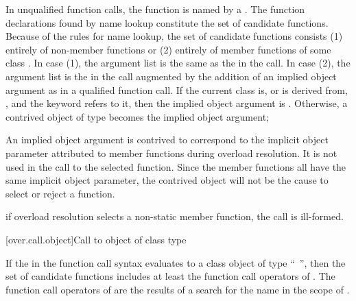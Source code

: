 \pnum
In unqualified function calls, the function is named by a
.
The function declarations found by name lookup constitute the
set of candidate functions.
Because of the rules for name lookup, the set of candidate functions
consists (1) entirely of non-member functions or (2) entirely of
member functions of some class
.
In case (1),
the argument list is
the same as the
in the call.
In case (2), the argument list is the
in the call augmented by the addition of an implied object
argument as in a qualified function call.
If the current class is, or is derived from, , and the keyword
 refers to it,
then the implied object argument is .
Otherwise,
a contrived object of type
becomes the implied object argument;
\begin{footnote}
An implied object argument is contrived to
correspond to the implicit object
parameter attributed to member functions during overload resolution.
It is not
used in
the call to the selected function.
Since the member functions all have the
same implicit
object parameter, the contrived object will not be the cause to select or
reject a
function.
\end{footnote}
if overload resolution selects a non-static member function,
the call is ill-formed.

[over.call.object]{Call to object of class type}

\pnum
If the  
in the function call syntax evaluates
to a class object of type ``\cv{}~'',
then the set of candidate functions
includes at least the function call operators of .
The function call operators of 
are the results of a search for the name 
in the scope of .

